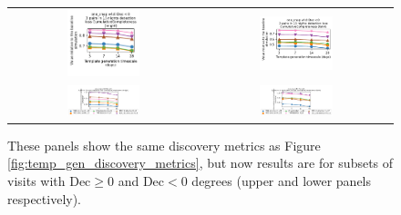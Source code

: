 \documentclass[preprintm,linenumbers]{aastex631}
\begin{document}
		\begin{figure}
			\centering
			\begin{tabular}{c c}
    				\includegraphics[width=0.4\textwidth]{results/one_snap_v4_0_n_visits_4_Dec_lt_0_discovery_metric_bright.pdf} &
				\includegraphics[width=0.4\textwidth]{results/one_snap_v4_0_n_visits_4_Dec_lt_0_discovery_metric_faint.pdf} \\
    				\includegraphics[width=0.4\textwidth]{results/one_snap_v4_0_n_visits_4_Dec_gtreq_0_discovery_metric_bright.pdf} &
				\includegraphics[width=0.4\textwidth]{results/one_snap_v4_0_n_visits_4_Dec_gtreq_0_discovery_metric_faint.pdf}
			\end{tabular}
			\caption{These panels show the same discovery metrics as Figure \protect\ref{fig:temp_gen_discovery_metrics}, but now results are for subsets of visits with Dec$\geq0$ and Dec$<0$ degrees (upper and lower panels respectively). 
			}
			\label{fig:temp_gen_discovery_metrics_dec}
		\end{figure}
		
\end{document}
